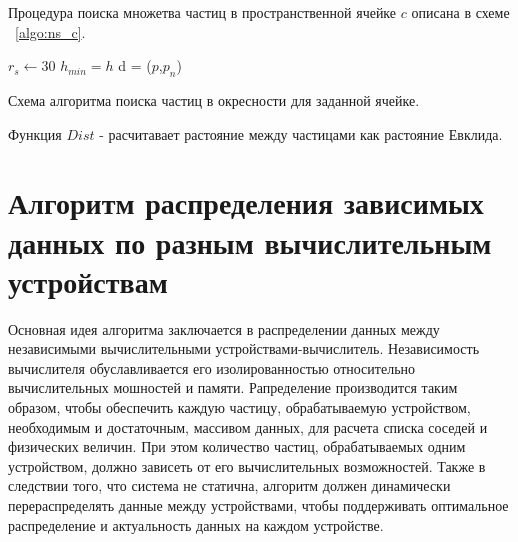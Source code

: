 Процедура поиска множетва частиц в пространственной ячейке \(c\) описана в схеме ~\ref{algo:ns_c}.

\begin{algorithm}[H]
  \label{algo:ns_c}
  \SetAlgoLined
  $r_s  \leftarrow 30 $\;
  $h_{min} = h$\;
  {
    d = \Dist($p$,$p_{n}$)\;
  }
  \caption{Схема алгоритма поиска частиц в окресности для заданной ячейке.}
\end{algorithm}

Функция \( Dist \) - расчитавает растояние между частицами как растояние Евклида.

\section{Алгоритм распределения зависимых данных по разным вычислительным устройствам}\label{sec:ch2/sec3}
Основная идея алгоритма заключается в распределении данных между независимыми вычислительными устройствами-вычислитель. Независимость вычислителя обуславливается его изолированностью относительно вычислительных мошностей и памяти. Рапределение производится таким образом, чтобы обеспечить каждую частицу, обрабатываемую устройством, необходимым и достаточным, массивом данных, для расчета списка соседей и физических величин. При этом количество частиц, обрабатываемых одним устройством, должно зависеть от его вычислительных возможностей. Также в следствии того, что система не статична, алгоритм должен динамически перераспределять данные между устройствами, чтобы поддерживать оптимальное распределение и актуальность данных на каждом устройстве.

